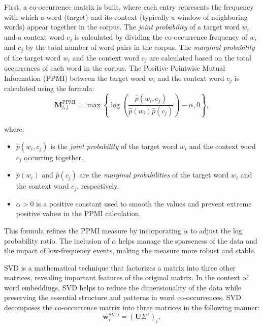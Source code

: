 First, a co-occurrence matrix is built, where each entry represents the frequency with which a word (target) and its context (typically a window of neighboring words) appear together in the corpus.
The \emph{joint probability} of a target word $w_i$ and a context word $c_j$ is calculated by dividing the co-occurrence frequency of $w_i$ and $c_j$ by the total number of word pairs in the corpus.
The \emph{marginal probability} of the target word $w_i$ and the context word $c_j$ are calculated based on the total occurrences of each word in the corpus.
The Positive Pointwise Mutual Information (PPMI) between the target word $w_i$ and the context word $c_j$ is calculated using the formula:
\begin{equation}
\mathbf{M}^{\text{PPMI}}_{i,j} = \max \left\{ \log \left( \frac{\hat{p}(w_i, c_j)}{\hat{p}(w_i) \hat{p}(c_j)} \right) - \alpha, 0 \right\},
\label{eq:ppmi}
\end{equation}

where:
\begin{itemize}
\item $\hat{p}(w_i, c_j)$ is the \emph{joint probability} of the target word $w_i$ and the context word $c_j$ occurring together.
\item $\hat{p}(w_i)$ and $\hat{p}(c_j)$ are the \emph{marginal probabilities} of the target word $w_i$ and the context word $c_j$, respectively.
\item $\alpha > 0$ is a positive constant used to smooth the values and prevent extreme positive values in the PPMI calculation.
\end{itemize}

This formula refines the PPMI measure by incorporating $\alpha$ to adjust the log probability ratio.
The inclusion of $\alpha$ helps manage the sparseness of the data and the impact of low-frequency events, making the measure more robust and stable.

SVD is a mathematical technique that factorizes a matrix into three other matrices, revealing important features of the original matrix.
In the context of word embeddings, SVD helps to reduce the dimensionality of the data while preserving the essential structure and patterns in word co-occurrences.
SVD decomposes the co-occurrence matrix into three matrices in the following manner:
\begin{equation}
\mathbf{w}_i^{\text{SVD}} = (\mathbf{U} \Sigma^\gamma)_i,
\label{eq:svd}
\end{equation}

